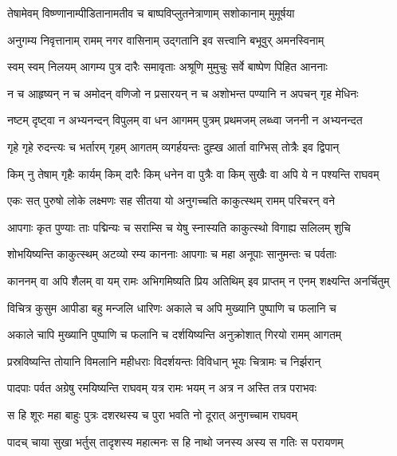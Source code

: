 
\twolineshloka
{तेषामेवम् विष्ण्णानाम्पीडितानामतीव च}
{बाष्पविप्लुतनेत्राणाम् सशोकानाम् मुमूर्षया} %

\twolineshloka
{अनुगम्य निवृत्तानाम् रामम् नगर वासिनाम्}
{उद्गतानि इव सत्त्वानि बभूवुर् अमनस्विनाम्} %

\twolineshloka
{स्वम् स्वम् निलयम् आगम्य पुत्र दारैः समावृताः}
{अश्रूणि मुमुचुः सर्वे बाष्पेण पिहित आननाः} %

\twolineshloka
{न च आहृष्यन् न च अमोदन् वणिजो न प्रसारयन्}
{न च अशोभन्त पण्यानि न अपचन् गृह मेधिनः} %

\twolineshloka
{नष्टम् दृष्ट्वा न अभ्यनन्दन् विपुलम् वा धन आगमम्}
{पुत्रम् प्रथमजम् लब्ध्वा जननी न अभ्यनन्दत} %

\twolineshloka
{गृहे गृहे रुदन्त्यः च भर्तारम् गृहम् आगतम्}
{व्यगर्हयन्तः दुह्ख आर्ता वाग्भिस् तोत्रैः इव द्विपान्} %

\twolineshloka
{किम् नु तेषाम् गृहैः कार्यम् किम् दारैः किम् धनेन वा}
{पुत्रैः वा किम् सुखैः वा अपि ये न पश्यन्ति राघवम्} %

\twolineshloka
{एकः सत् पुरुषो लोके लक्ष्मणः सह सीतया}
{यो अनुगच्चति काकुत्स्थम् रामम् परिचरन् वने} %

\twolineshloka
{आपगाः कृत पुण्याः ताः पद्मिन्यः च सराम्सि च}
{येषु स्नास्यति काकुत्स्थो विगाह्य सलिलम् शुचि} %

\twolineshloka
{शोभयिष्यन्ति काकुत्स्थम् अटव्यो रम्य काननाः}
{आपगाः च महा अनूपाः सानुमन्तः च पर्वताः} %

\twolineshloka
{काननम् वा अपि शैलम् वा यम् रामः अभिगमिष्यति}
{प्रिय अतिथिम् इव प्राप्तम् न एनम् शक्ष्यन्ति अनर्चितुम्} %

\twolineshloka
{विचित्र कुसुम आपीडा बहु मन्जलि धारिणः}
{अकाले च अपि मुख्यानि पुष्पाणि च फलानि च} %

\twolineshloka
{अकाले चापि मुख्यानि पुष्पाणि च फलानि च}
{दर्शयिष्यन्ति अनुक्रोशात् गिरयो रामम् आगतम्} %

\twolineshloka
{प्रस्रविष्यन्ति तोयानि विमलानि महीधराः}
{विदर्शयन्तः विविधान् भूयः चित्रामः च निर्झरान्} %

\twolineshloka
{पादपाः पर्वत अग्रेषु रमयिष्यन्ति राघवम्}
{यत्र रामः भयम् न अत्र न अस्ति तत्र पराभवः} %

\twolineshloka
{स हि शूरः महा बाहुः पुत्रः दशरथस्य च}
{पुरा भवति नो दूरात् अनुगच्चाम राघवम्} %

\twolineshloka
{पादच् चाया सुखा भर्तुस् तादृशस्य महात्मनः}
{स हि नाथो जनस्य अस्य स गतिः स परायणम्} %

